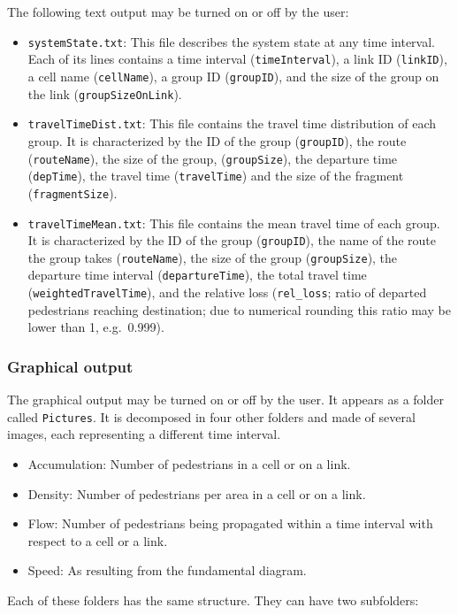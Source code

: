 \documentclass[a4paper,12pt]{article}
\begin{document}
The following text output may be turned on or off by the user:

\begin{itemize}
\item \verb+systemState.txt+: This file describes the system state at any time interval. Each of its lines contains a time interval (\verb+timeInterval+), a link ID (\verb+linkID+), a cell name (\verb+cellName+), a group ID (\verb+groupID+), and the size of the group on the link (\verb+groupSizeOnLink+).

\item \verb+travelTimeDist.txt+: This file contains the travel time distribution of each group. It is characterized by the ID of the group (\verb+groupID+), the route (\verb+routeName+), the size of the group, (\verb+groupSize+), the departure time (\verb+depTime+), the travel time (\verb+travelTime+) and the size of the fragment (\verb+fragmentSize+).

\item \verb+travelTimeMean.txt+: This file contains the mean travel time of each group. It is characterized by the ID of the group (\verb+groupID+), the name of the route the group takes (\verb+routeName+), the size of the group (\verb+groupSize+), the departure time interval (\verb+departureTime+), the total travel time (\verb+weightedTravelTime+), and the relative loss (\verb+rel_loss+; ratio of departed pedestrians reaching destination; due to numerical rounding this ratio may be lower than 1, e.g.\ 0.999).
\end{itemize}

\subsubsection{Graphical output}

The graphical output may be turned on or off by the user. It appears as a folder called \verb+Pictures+. It is decomposed in four other folders and made of several images, each representing a different time interval.  

\begin{itemize}
\item Accumulation: Number of pedestrians in a cell or on a link.
\item Density: Number of pedestrians per area in a cell or on a link.
\item Flow: Number of pedestrians being propagated within a time interval with respect to a cell or a link.
\item Speed: As resulting from the fundamental diagram.
\end{itemize}
Each of these folders has the same structure. They can have two subfolders: 
\end{document}
